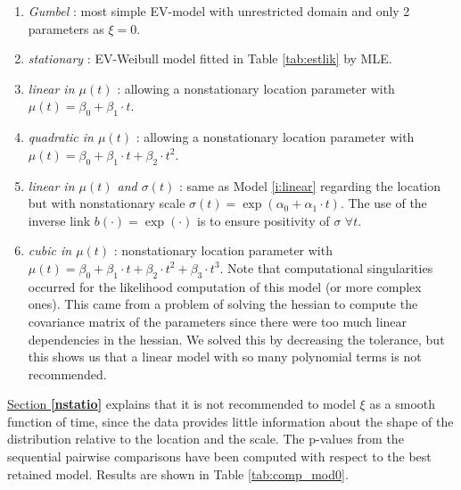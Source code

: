 \begin{enumerate}
	\item \emph{Gumbel} : most simple  EV-model with unrestricted domain and only 2 parameters as $\xi=0$.
	\item \emph{stationary} : EV-Weibull model fitted in Table \ref{tab:estlik} by MLE.
	\item\label{i:linear} \emph{linear in $\mu(t)$} : allowing a nonstationary location parameter with $\mu(t)=\beta_0+\beta_1\cdot t$.
	\item \emph{quadratic in $\mu(t)$} : allowing a nonstationary location parameter with $\mu(t)=\beta_0+\beta_1\cdot t+\beta_2\cdot t^2$.
	\item \emph{linear in $\mu(t)$ and $\sigma(t)$} : same as Model \ref{i:linear} regarding the location but with nonstationary scale $\sigma(t)=\exp(\alpha_0+\alpha_1\cdot t)$. The use of the inverse link $b(\cdot)=\exp(\cdot)$ is to ensure positivity of $\sigma$ $\forall t$.
	\item \emph{cubic in $\mu(t)$} : nonstationary location parameter with $\mu(t)=\beta_0+\beta_1\cdot t+\beta_2\cdot t^2+\beta_3\cdot t^3$. Note that computational singularities occurred for the likelihood computation of this model (or more complex ones). This came from a problem of solving the hessian to compute the covariance matrix of the parameters since there were too much linear dependencies in the hessian. We solved this by decreasing the tolerance, but this shows us that a linear model with so many polynomial terms is not recommended.
\end{enumerate}
\hyperref[nstatio]{Section \textbf{\ref{nstatio}}} explains that it is not recommended to model $\xi$ as a smooth function of time, since the data provides little information about the shape of the distribution relative to the location and the scale.
The p-values from the sequential pairwise comparisons have been computed with respect to the best retained model. Results are shown in Table \ref{tab:comp_mod0}.

